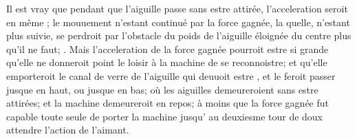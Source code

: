 \pstart Il est vray que pendant que l'aiguille\protect{} passe sans estre attir\'{e}e, l'acceleration\protect{} seroit en m\^{e}me ; le mouuement n'estant continu\'{e} par la force gagn\'{e}e\protect{}, la quelle, n'estant plus suivie, se perdroit  par l'obstacle du poids de l'aiguille\protect{} \'{e}loign\'{e}e du centre plus qu'il ne faut; . Mais l'acceleration\protect{} de la force gagn\'{e}e\protect{} pourroit estre si grande qu'elle ne donneroit point le loisir \`{a} la machine de se reconnoistre; et qu'elle emporteroit le canal de verre de l'aiguille\protect{} qui deuuoit estre , et le feroit passer jusque en haut, ou jusque en bas; o\`{u} les aiguilles\protect{} demeureroient sans estre attir\'{e}es; et la machine demeureroit en repos; \`{a} moins que la force gagn\'{e}e\protect{} fut capable toute seule de porter la machine jusqu' au deuxiesme tour de  doux  attendre l'action de l'aimant. 
\pend 
\vspace{-1mm}
\pstart
